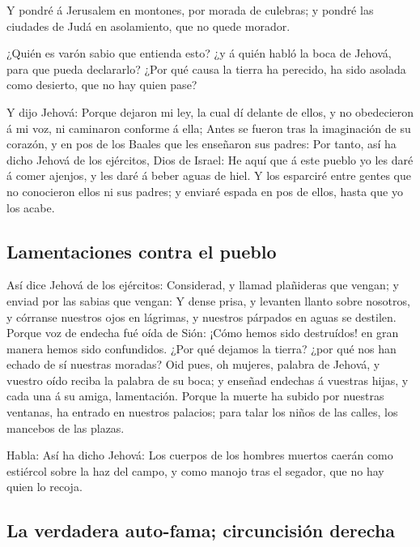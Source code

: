  Y pondré á Jerusalem en montones, por morada de
culebras; y pondré las ciudades de Judá en asolamiento, que no quede
morador.

 ¿Quién es varón sabio que entienda esto? ¿y á quién
habló la boca de Jehová, para que pueda declararlo? ¿Por qué causa la
tierra ha perecido, ha sido asolada como desierto, que no hay quien
pase?

 Y dijo Jehová: Porque dejaron mi ley, la cual dí delante
de ellos, y no obedecieron á mi voz, ni caminaron conforme á ella;
 Antes se fueron tras la imaginación de su corazón, y en
pos de los Baales que les enseñaron sus padres:  Por
tanto, así ha dicho Jehová de los ejércitos, Dios de Israel: He aquí que
á este pueblo yo les daré á comer ajenjos, y les daré á beber aguas de
hiel.  Y los esparciré entre gentes que no conocieron
ellos ni sus padres; y enviaré espada en pos de ellos, hasta que yo los
acabe.

\hypertarget{lamentaciones-contra-el-pueblo}{%
\subsection{Lamentaciones contra el
pueblo}\label{lamentaciones-contra-el-pueblo}}

 Así dice Jehová de los ejércitos: Considerad, y llamad
plañideras que vengan; y enviad por las sabias que vengan:
 Y dense prisa, y levanten llanto sobre nosotros, y
córranse nuestros ojos en lágrimas, y nuestros párpados en aguas se
destilen.  Porque voz de endecha fué oída de Sión: ¡Cómo
hemos sido destruídos! en gran manera hemos sido confundidos. ¿Por qué
dejamos la tierra? ¿por qué nos han echado de sí nuestras moradas?
 Oid pues, oh mujeres, palabra de Jehová, y vuestro oído
reciba la palabra de su boca; y enseñad endechas á vuestras hijas, y
cada una á su amiga, lamentación.  Porque la muerte ha
subido por nuestras ventanas, ha entrado en nuestros palacios; para
talar los niños de las calles, los mancebos de las plazas.

 Habla: Así ha dicho Jehová: Los cuerpos de los hombres
muertos caerán como estiércol sobre la haz del campo, y como manojo tras
el segador, que no hay quien lo recoja.

\hypertarget{la-verdadera-auto-fama-circuncisiuxf3n-derecha}{%
\subsection{La verdadera auto-fama; circuncisión
derecha}\label{la-verdadera-auto-fama-circuncisiuxf3n-derecha}}

